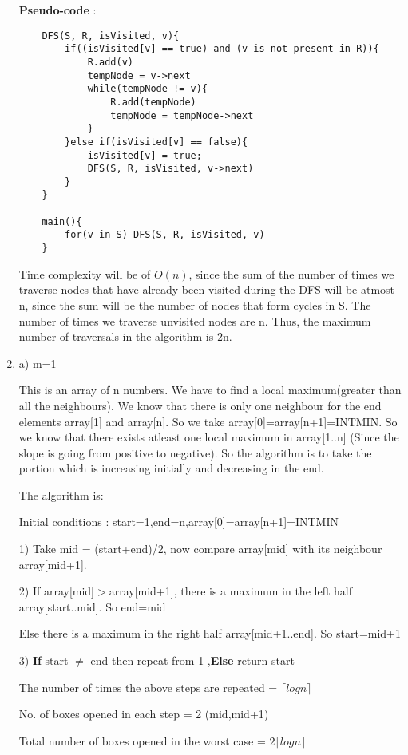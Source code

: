 \documentclass[12pt]{article}
\begin{document}
\begin{enumerate}
    \textbf{Pseudo-code} :
    \begin{verbatim}
    DFS(S, R, isVisited, v){
        if((isVisited[v] == true) and (v is not present in R)){
            R.add(v)
            tempNode = v->next
            while(tempNode != v){
                R.add(tempNode)
                tempNode = tempNode->next
            }
        }else if(isVisited[v] == false){
            isVisited[v] = true;
            DFS(S, R, isVisited, v->next)
        }
    }
    
    main(){
        for(v in S) DFS(S, R, isVisited, v)
    }
    \end{verbatim}
    Time complexity will be of $O(n)$, since the sum of the number of times we traverse nodes that have already been visited during the DFS will be atmost n, since the sum will be the number of nodes that form cycles in S. The number of times we traverse unvisited nodes are n. Thus, the maximum number of traversals in the algorithm is 2n.
    \item
    a) m=1
    
    This is an array of n numbers. We have to find a local maximum(greater than all the neighbours). We know that there is only one neighbour for the end elements array[1] and array[n]. So we take array[0]=array[n+1]=INTMIN. So we know that there exists atleast one local maximum in array[1..n] (Since the slope is going from positive to negative). So the algorithm is to take the portion which is increasing initially and decreasing in the end.
    
    The algorithm is:
    
    Initial conditions : start=1,end=n,array[0]=array[n+1]=INTMIN
    
    1) Take mid = (start+end)/2, now compare array[mid] with its neighbour array[mid+1].
    
    2) If array[mid]$>$array[mid+1], there is a maximum in the left half array[start..mid]. So end=mid
    
    Else there is a maximum in the right half array[mid+1..end]. So start=mid+1
    
    3) \textbf{If} start $\neq$ end then repeat from 1 ,\textbf{Else} return start
    
    The number of times the above steps are repeated = $\lceil logn \rceil$
    
    No. of boxes opened in each step = 2 (mid,mid+1)
    
    Total number of boxes opened in the worst case = $2\lceil logn \rceil$
    

\end{enumerate}
\end{document}
